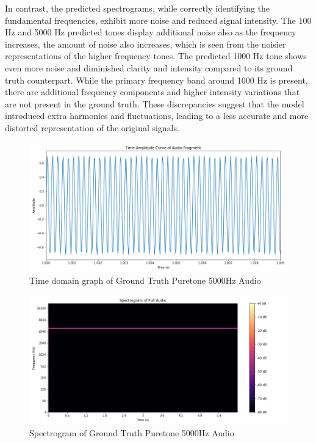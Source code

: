 \documentclass{ioereport}
\begin{document}
    In contrast, the predicted spectrograms, while correctly identifying the fundamental frequencies, exhibit more noise and reduced signal intensity. The 100 Hz and 5000 Hz predicted tones display additional noise also as the frequency increases, the amount of noise also increases, which is seen from the noisier representations of the higher frequency tones. The predicted 1000 Hz tone shows even more noise and diminished clarity and intensity compared to its ground truth counterpart. While the primary frequency band around 1000 Hz is present, there are additional frequency components and higher intensity variations that are not present in the ground truth. These discrepancies suggest that the model introduced extra harmonics and fluctuations, leading to a less accurate and more distorted representation of the original signals. 

    \begin{figure}[H]
        \centering
        \includegraphics[width=\linewidth]{assets/audio_results/puretone5000hztime.png}
        \caption{Time domain graph of Ground Truth Puretone 5000Hz Audio}
        \label{fig:gt-pure5000-time}
    \end{figure}
    \begin{figure}[H]
        \centering
        \includegraphics[width=\linewidth]{assets/audio_results/puretone5000hzspec.png}
        \caption{Spectrogram of Ground Truth Puretone 5000Hz Audio}
        \label{fig:gt-pure5000-spec}
    \end{figure}
    
\end{document}

